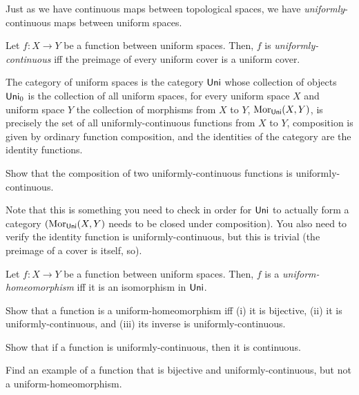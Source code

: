 Just as we have continuous maps between topological spaces, we have \emph{uniformly}-continuous maps between uniform spaces.
\begin{dfn}
Let $f:X\rightarrow Y$ be a function between uniform spaces.  Then, $f$ is \emph{uniformly-continuous} iff the preimage of every uniform cover is a uniform cover.
\end{dfn}
\begin{exm}
The category of uniform spaces is the category $\Uni$\index[notation]{$\Uni$} whose collection of objects $\mathsf{Uni} _0$ is the collection of all uniform spaces, for every uniform space $X$ and uniform space $Y$ the collection of morphisms from $X$ to $Y$, $\operatorname{Mor} _{\mathsf{Uni}}(X,Y)$, is precisely the set of all uniformly-continuous functions from $X$ to $Y$, composition is given by ordinary function composition, and the identities of the category are the identity functions.
\begin{exr}
Show that the composition of two uniformly-continuous functions is uniformly-continuous.
\begin{rmk}
Note that this is something you need to check in order for $\Uni$ to actually form a category $(\operatorname{Mor} _{\mathsf{Uni}}(X,Y)$ needs to be closed under composition).  You also need to verify the identity function is uniformly-continuous, but this is trivial (the preimage of a cover is itself, so\textellipsis ).
\end{rmk}
\end{exr}
\end{exm}
\begin{dfn}\label{UniformHomeomorphism}
Let $f:X\rightarrow Y$ be a function between uniform spaces.  Then, $f$ is a \emph{uniform-homeomorphism} iff it is an isomorphism in $\Uni$.
\end{dfn}
\begin{exr}
Show that a function is a uniform-homeomorphism iff (i) it is bijective, (ii) it is uniformly-continuous, and (iii) its inverse is uniformly-continuous.
\end{exr}
\begin{exr}
Show that if a function is uniformly-continuous, then it is continuous.
\end{exr}
\begin{exr}
Find an example of a function that is bijective and uniformly-continuous, but not a uniform-homeomorphism.
\end{exr}

